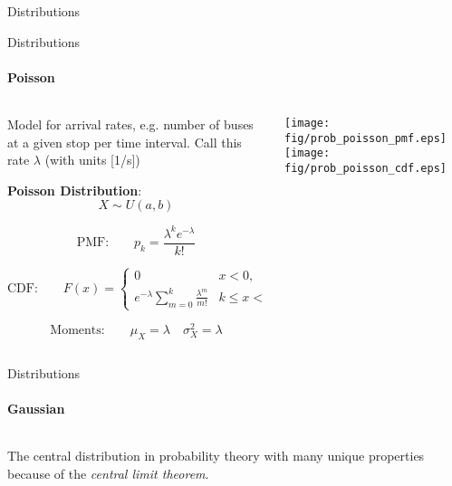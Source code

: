{\begin{frame}{Distributions}
    \end{frame}

    \begin{frame}{Distributions}
        \framesubtitle{{Poisson}}
        \vspace*{-8mm}
        \begin{columns}[onlytextwidth]
            \begin{column}{0.57\textwidth}
                Model for arrival rates, e.g. number of buses at a given stop per
                time interval. Call this rate $\lambda$ (with units [1/s])
                \vspace*{2mm}

                \begin{boxed}
                    \textbf{Poisson Distribution}:
                    $$X \sim U(a, b)$$

                    $$\text{PMF:}\qquad p_k = \frac{\lambda^ke^{-\lambda}}{k!}$$

                    $$\text{CDF:}\qquad F(x) = \begin{cases} 0 & x < 0, \\ e^{-\lambda}\sum_{m = 0}^k \frac{\lambda^m}{m!} & k \le x < k+1 \text{ with } 0 \le k \end{cases}$$

                    $$\text{Moments:}\qquad \displaystyle \mu_X = \lambda \quad \sigma_X^2 = \lambda$$
                \end{boxed}
            \end{column}
            \begin{column}{0.43\textwidth}
                \begin{center}
                    \texttt{[image: fig/prob\_poisson\_pmf.eps]}
                    \texttt{[image: fig/prob\_poisson\_cdf.eps]}
                \end{center}
            \end{column}
        \end{columns}
    \end{frame}

    \begin{frame}{Distributions}
        \framesubtitle{Gaussian}

        \begin{columns}[onlytextwidth]
            \begin{column}{0.55\textwidth}
                The central distribution in probability theory with many unique properties because of
                the \emph{central limit theorem}.\\[1mm]


\end{column}
\end{columns}
\end{frame}}
